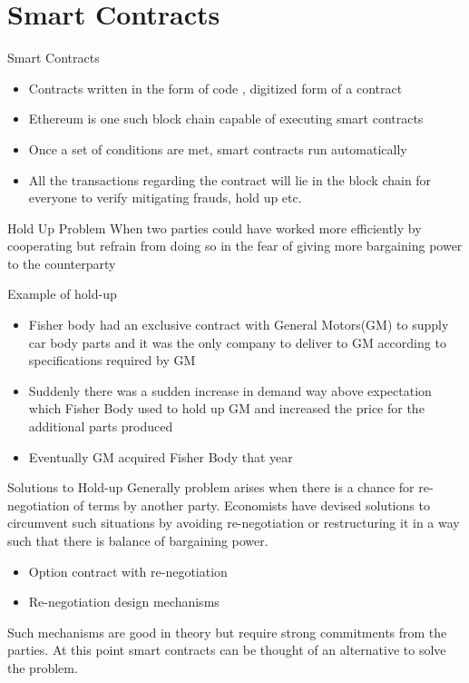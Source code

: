 \documentclass{beamer}
\begin{document}
\section{Smart Contracts}
\begin{frame}{Smart Contracts}
\begin{itemize}
    \item Contracts written in the form of code , digitized form of a contract
    \item Ethereum is one such block chain capable of executing smart contracts
    \item Once a set of conditions are met, smart contracts run automatically
    \item All the transactions regarding the contract will lie in the block chain for everyone to verify mitigating frauds, hold up etc.
\end{itemize}
    
\end{frame}
\begin{frame}{Hold Up Problem}
    When two parties could have worked more efficiently by cooperating but refrain from doing so in the fear of giving more bargaining power to the counterparty
    
\end{frame}
\begin{frame}{Example of hold-up}
\begin{itemize}
    \item Fisher body had an exclusive contract with General Motors(GM) to supply car body parts and it was the only company to deliver to GM according to specifications required by GM
    \item Suddenly there was a sudden increase in demand way above expectation which Fisher Body used to hold up GM and increased the price for the additional parts produced
\item Eventually GM acquired Fisher Body that year
\end{itemize}
    
\end{frame}
\begin{frame}{Solutions to Hold-up}
Generally problem arises when there is a chance for re-negotiation of terms by another party. Economists have devised solutions to circumvent such situations by avoiding re-negotiation or restructuring it in a way such that there is balance of bargaining power.
\begin{itemize}
    \item Option contract with re-negotiation
    \item Re-negotiation design mechanisms
\end{itemize}
Such mechanisms are good in theory but require strong commitments from the parties. At this point smart contracts can be thought of an alternative to solve the problem.
    
\end{frame}
\end{document}
